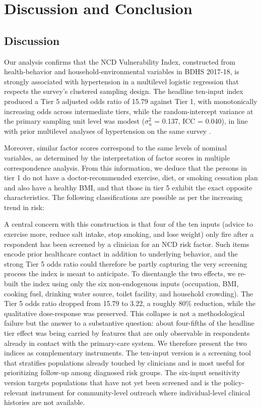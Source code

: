 \documentclass[
  12pt,
  a4paper]{article}
\begin{document}
\section{Discussion and Conclusion}\label{discussion-and-conclusion}

\subsection{Discussion}\label{discussion}

Our analysis confirms that the NCD Vulnerability Index, constructed from health-behavior and household-environmental variables in BDHS 2017-18, is strongly associated with hypertension in a multilevel logistic regression that respects the survey's clustered sampling design. The headline ten-input index produced a Tier 5 adjusted odds ratio of 15.79 against Tier 1, with monotonically increasing odds across intermediate tiers, while the random-intercept variance at the primary sampling unit level was modest (\(\sigma^2_u\) = 0.137, ICC = 0.040), in line with prior multilevel analyses of hypertension on the same survey \citep{ghosh2023prevalence}.

Moreover, similar factor scores correspond to the same levels of nominal variables, as determined by the interpretation of factor scores in multiple correspondence analysis. From this information, we deduce that the persons in tier 1 do not have a doctor-recommended exercise, diet, or smoking cessation plan and also have a healthy BMI, and that those in tier 5 exhibit the exact opposite characteristics. The following classifications are possible as per the increasing trend in risk:



A central concern with this construction is that four of the ten inputs (advice to exercise more, reduce salt intake, stop smoking, and lose weight) only fire after a respondent has been screened by a clinician for an NCD risk factor. Such items encode prior healthcare contact in addition to underlying behavior, and the strong Tier 5 odds ratio could therefore be partly capturing the very screening process the index is meant to anticipate. To disentangle the two effects, we re-built the index using only the six non-endogenous inputs (occupation, BMI, cooking fuel, drinking water source, toilet facility, and household crowding). The Tier 5 odds ratio dropped from 15.79 to 3.22, a roughly 80\% reduction, while the qualitative dose-response was preserved. This collapse is not a methodological failure but the answer to a substantive question: about four-fifths of the headline tier effect was being carried by features that are only observable in respondents already in contact with the primary-care system. We therefore present the two indices as complementary instruments. The ten-input version is a screening tool that stratifies populations already touched by clinicians and is most useful for prioritizing follow-up among diagnosed risk groups. The six-input sensitivity version targets populations that have not yet been screened and is the policy-relevant instrument for community-level outreach where individual-level clinical histories are not available.
\end{document}
